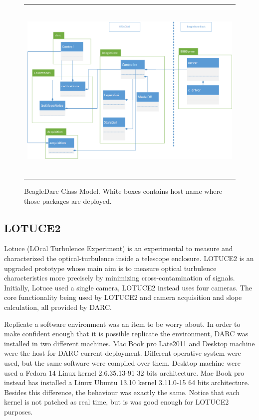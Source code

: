 \documentclass[]{spie}  %
\begin{document}
   \begin{figure}[!ht]
   \begin{center}
   \begin{tabular}{c}
   \includegraphics[height=9.0cm]{../img/class_model2.png}
   \end{tabular}
   \end{center}
   \caption[class] 
   { \label{fig:class} BeagleDarc Class Model. White boxes contains host name where those packages are deployed.}
   \end{figure}
\subsection{LOTUCE2}
Lotuce (LOcal Turbulence Experiment) is an experimental to measure and
characterized the optical-turbulence inside a telescope enclosure. LOTUCE2 is
an upgraded prototype whose main aim is to measure optical turbulence
characteristics more precisely by minimizing cross-contamination of signals.
Initially, Lotuce used a single camera, LOTUCE2 instead  uses four cameras. The
core functionality being used by LOTUCE2 and camera acquisition and slope
calculation, all provided by DARC.  

Replicate a software environment was an item to be worry about. In order to
make confident enough that it is possible replicate the environment, DARC was
installed in two different machines. Mac Book pro Late2011 and Desktop machine
were the host for DARC current deployment. Different operative system were used,
     but the same software were compiled over them. Desktop machine were used a
     Fedora 14 Linux kernel 2.6.35.13-91 32 bits architecture. Mac Book pro
     instead has installed a Linux Ubuntu 13.10 kernel 3.11.0-15 64 bits
     architecture.  Besides this difference, the behaviour was exactly the
     same. Notice that each kernel is not patched as real time, but is was good
     enough for LOTUCE2 purposes.
\end{document}
